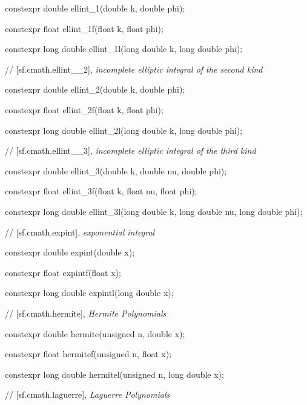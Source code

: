 \documentclass[prd,twocolumn,amsmath,amssymb,nofootinbib,eqsecnum]{revtex4-1}
\newcommand{\highlight}[1]{{\color{red} #1}}
\begin{document}
{\highlight{constexpr} double ellint\_1(double k, double phi);
	
\highlight{constexpr} float ellint\_1f(float k, float phi);
	
\highlight{constexpr} long double ellint\_1l(long double k, long double phi);

\vspace{2ex}
// [sf.cmath.ellint\_\_2], {\em incomplete elliptic integral of the second kind}
\vspace{2ex}

\highlight{constexpr} double ellint\_2(double k, double phi);
	
\highlight{constexpr} float ellint\_2f(float k, float phi);
	
\highlight{constexpr} long double ellint\_2l(long double k, long double phi);

\vspace{2ex}
// [sf.cmath.ellint\_\_3], {\em incomplete elliptic integral of the third kind}
\vspace{2ex}

\highlight{constexpr} double ellint\_3(double k, double nu, double phi);
	
\highlight{constexpr} float ellint\_3f(float k, float nu, float phi);
	
\highlight{constexpr} long double ellint\_3l(long double k, long double nu, long double phi);

\vspace{2ex}
// [sf.cmath.expint], {\em exponential integral}
\vspace{2ex}

\highlight{constexpr} double expint(double x);
	
\highlight{constexpr} float expintf(float x);
	
\highlight{constexpr} long double expintl(long double x);

\vspace{2ex}
// [sf.cmath.hermite], {\em Hermite Polynomials}
\vspace{2ex}

\highlight{constexpr} double hermite(unsigned n, double x);
	
\highlight{constexpr} float hermitef(unsigned n, float x);
	
\highlight{constexpr} long double hermitel(unsigned n, long double x);

\vspace{2ex}
// [sf.cmath.laguerre], {\em Laguerre Polynomials}
\vspace{2ex}

}
\end{document}
